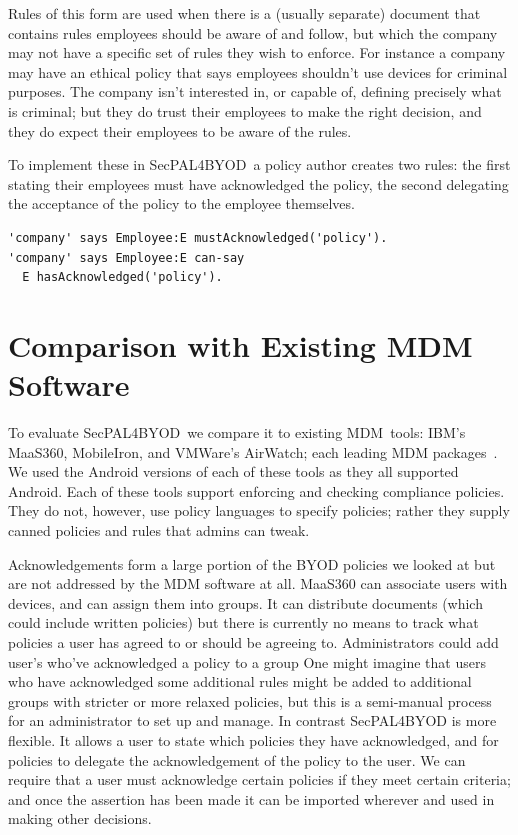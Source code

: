 \documentclass{llncs}
\newcommand{\AppPAL}[0]{SecPAL4BYOD}
\begin{document}
Rules of this form are used when there is a (usually separate) document that contains rules employees should be aware of and follow, but which the company may not have a specific set of rules they wish to enforce.
For instance a company may have an ethical policy that says employees shouldn't use devices for criminal purposes.
The company isn't interested in, or capable of, defining precisely what is criminal;
  but they do trust their employees to make the right decision, and they do expect their employees to be aware of the rules.

To implement these in \AppPAL~a policy author creates two rules: 
  the first stating their employees must have acknowledged the policy,
  the second delegating the acceptance of the policy to the employee themselves.
\begin{lstlisting}
'company' says Employee:E mustAcknowledged('policy').
'company' says Employee:E can-say
  E hasAcknowledged('policy').
\end{lstlisting}

\section{Comparison with Existing MDM Software}

To evaluate \AppPAL~we compare it to existing MDM~tools: IBM's MaaS360, MobileIron, and VMWare's AirWatch; each leading MDM packages~\cite{rob_smith_magic_2016}.
We used the Android versions of each of these tools as they all supported Android.
Each of these tools support enforcing and checking compliance policies. 
They do not, however, use policy languages to specify policies; rather they supply canned policies and rules that admins can tweak.

Acknowledgements form a large portion of the BYOD policies we looked at but are not addressed by the MDM software at all.
MaaS360 can associate users with devices, and can assign them into groups.
It can distribute documents (which could include written policies) but there is currently no means to track what policies a user has agreed to or should be agreeing to.
Administrators could add user's who've acknowledged a policy to a group
One might imagine that users who have acknowledged some additional rules might be added to additional groups with stricter or more relaxed policies, but this is a semi-manual process for an administrator to set up and manage.
In contrast \AppPAL{} is more flexible. 
It allows a user to state which policies they have acknowledged, and for policies to delegate the acknowledgement of the policy to the user.
We can require that a user must acknowledge certain policies if they meet certain criteria;
and once the assertion has been made it can be imported wherever and used in making other decisions.
\end{document}

